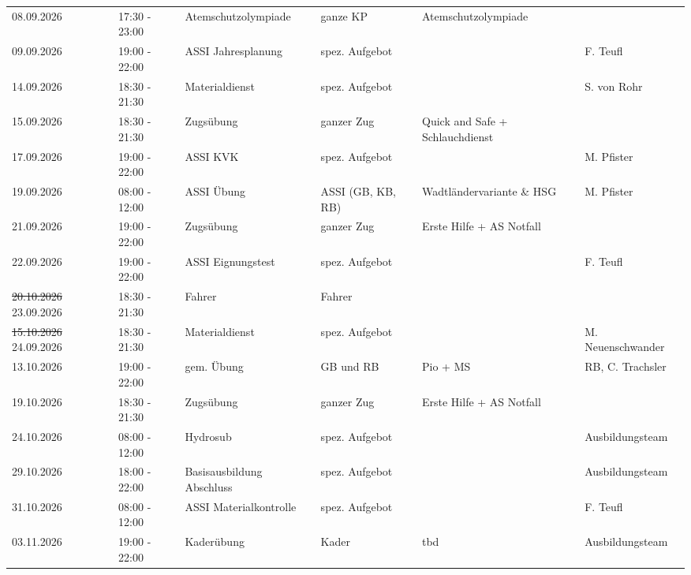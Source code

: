\documentclass[11pt,a4paper]{article}
\begin{document}
\begin{adjustwidth}{1.5cm}{1.5cm}
\begin{longtable}{llllll}
08.09.2026 & 17:30 - 23:00 & Atemschutzolympiade & ganze KP & \color{OliveGreen}Atemschutzolympiade & \color{OliveGreen} \\
\color{OliveGreen}09.09.2026 & \color{OliveGreen}19:00 - 22:00 & \color{OliveGreen}ASSI Jahresplanung & \color{OliveGreen}spez. Aufgebot & \color{OliveGreen} & \color{OliveGreen}F. Teufl \\
14.09.2026 & 18:30 - 21:30 & Materialdienst & spez. Aufgebot & \color{OliveGreen} & \color{OliveGreen}S. von Rohr \\
15.09.2026 & 18:30 - 21:30 & Zugs\"ubung & ganzer Zug & \color{OliveGreen}Quick and Safe + Schlauchdienst & \color{OliveGreen} \\
17.09.2026 & 19:00 - 22:00 & ASSI KVK & spez. Aufgebot & \color{OliveGreen} & \color{OliveGreen}M. Pfister \\
19.09.2026 & 08:00 - 12:00 & ASSI \"Ubung & ASSI (GB, KB, RB) & \color{OliveGreen}Wadtl\"andervariante \& HSG & \color{OliveGreen}M. Pfister \\
21.09.2026 & 19:00 - 22:00 & Zugs\"ubung & ganzer Zug & \color{OliveGreen}Erste Hilfe + AS Notfall & \color{OliveGreen} \\
22.09.2026 & 19:00 - 22:00 & ASSI Eignungstest & spez. Aufgebot & \color{OliveGreen} & \color{OliveGreen}F. Teufl \\
\color{BrickRed}\sout{20.10.2026} \color{OliveGreen}23.09.2026 & 18:30 - 21:30 & Fahrer & Fahrer & \color{OliveGreen} & \color{OliveGreen} \\
\color{BrickRed}\sout{15.10.2026} \color{OliveGreen}24.09.2026 & 18:30 - 21:30 & Materialdienst & spez. Aufgebot & \color{OliveGreen} & \color{OliveGreen}M. Neuenschwander \\
13.10.2026 & 19:00 - 22:00 & gem. \"Ubung & GB und RB & \color{OliveGreen}Pio + MS & \color{OliveGreen}RB, C. Trachsler \\
19.10.2026 & 18:30 - 21:30 & Zugs\"ubung & ganzer Zug & \color{OliveGreen}Erste Hilfe + AS Notfall & \color{OliveGreen} \\
24.10.2026 & 08:00 - 12:00 & Hydrosub & spez. Aufgebot & \color{OliveGreen} & \color{OliveGreen}Ausbildungsteam \\
29.10.2026 & 18:00 - 22:00 & Basisausbildung Abschluss & spez. Aufgebot & \color{OliveGreen} & \color{OliveGreen}Ausbildungsteam \\
31.10.2026 & 08:00 - 12:00 & ASSI Materialkontrolle & spez. Aufgebot & \color{OliveGreen} & \color{OliveGreen}F. Teufl \\
03.11.2026 & 19:00 - 22:00 & Kader\"ubung & Kader & \color{OliveGreen}tbd & \color{OliveGreen}Ausbildungsteam \\

\end{longtable}
\end{adjustwidth}
\end{document}
